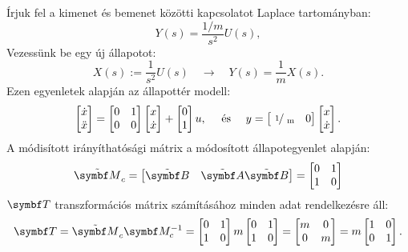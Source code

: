 Írjuk fel a kimenet és bemenet közötti kapcsolatot Laplace tartományban:
\begin{equation}
  Y(s) = \frac{1 / m}{s^2} U(s),
\end{equation}
Vezessünk be egy új állapotot:
\begin{equation}
  X(s):=\frac{1}{s^2} U(s)
  \quad \rightarrow \quad
  Y(s) = \frac{1}{m} X(s).
\end{equation}
Ezen egyenletek alapján az állapottér modell:
\begin{equation}
  \begin{bmatrix}
    \dot x \\ \ddot x
  \end{bmatrix} = \begin{bmatrix}
    0 & 1 \\ 0 & 0
  \end{bmatrix} \begin{bmatrix}
    x \\ \dot x
  \end{bmatrix} + \begin{bmatrix}
    0 \\ 1
  \end{bmatrix} u,
  \quad \text{ és } \quad
  y = \begin{bmatrix}
    \slashfrac{1}{m} & 0
  \end{bmatrix} \begin{bmatrix}
    x \\ \dot x
  \end{bmatrix}.
\end{equation}
A módisított irányíthatósági mátrix a módosított állapotegyenlet alapján:
\begin{equation}
  \tmat M_c = \begin{bmatrix}
    \tmat B & \tmat A \tmat B
  \end{bmatrix} = \begin{bmatrix}
    0 & 1 \\
    1 & 0
  \end{bmatrix}
\end{equation}
$\rmat T$ transzformációs mátrix számításához minden adat rendelkezésre áll:
\begin{equation}
  \rmat T
  = \tmat M_c \rmat M_c^{-1}
  = \begin{bmatrix}
    0 & 1 \\ 1 & 0
  \end{bmatrix} m \begin{bmatrix}
    0 & 1 \\ 1 & 0
  \end{bmatrix} = \begin{bmatrix}
    m & 0 \\ 0 & m
  \end{bmatrix} = m \begin{bmatrix}
    1 & 0 \\ 0 & 1
  \end{bmatrix}.
\end{equation}
